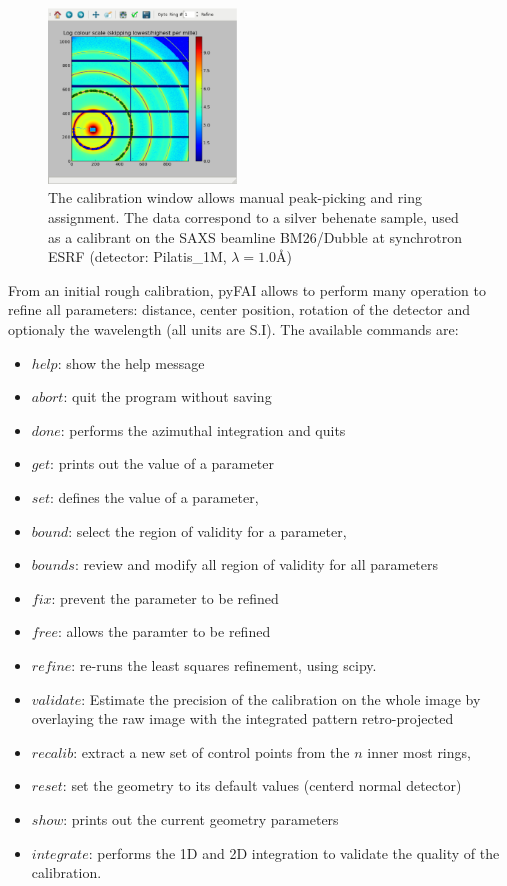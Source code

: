 \documentclass[preprint]{iucr}
\begin{document}
\begin{figure}
\label{calib}
\begin{center}
\includegraphics[width=5cm]{calib.eps}
\caption{The calibration window allows manual peak-picking and
ring assignment. The data correspond to a silver behenate sample, used as a
calibrant on the SAXS beamline BM26/Dubble at synchrotron ESRF (detector:
Pilatis_1M, $\lambda=1.0${\AA})}
\end{center}
\end{figure}

From an initial rough calibration, pyFAI allows to perform many operation to
refine all parameters: distance, center position, rotation of the detector and
optionaly the wavelength (all units are S.I). 
The available commands are:
\begin{itemize}
\item $help$: show the help message
\item $abort$: quit the program without saving
\item $done$: performs the azimuthal integration and quits
\item $get$: prints out the value of a parameter 
\item $set$: defines the value of a parameter,  
\item $bound$: select the region of validity for a parameter, 
\item $bounds$: review and modify all region of validity for all parameters
\item $fix$: prevent the parameter to be refined 
\item $free$: allows the paramter to be refined 
\item $refine$: re-runs the least squares refinement, using scipy.
\item $validate$: Estimate the precision of the calibration on the whole
image by overlaying the raw image with the integrated pattern retro-projected
\item $recalib$: extract a new set of control points from the $n$ inner most
rings,
\item $reset$: set the geometry to its default values (centerd normal detector)
\item $show$: prints out the current geometry parameters
\item $integrate$: performs the 1D and 2D integration to validate the quality of
the calibration.
\end{itemize}
\end{document}
